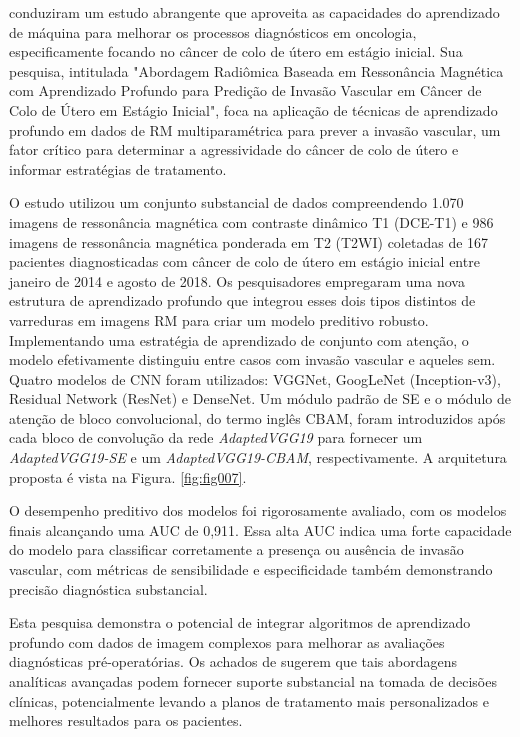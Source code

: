  \cite{jiangMRIBasedRadiomics2021} conduziram um estudo abrangente que aproveita as capacidades do aprendizado de máquina para melhorar os processos diagnósticos em oncologia, especificamente focando no câncer de colo de útero em estágio inicial. Sua pesquisa, intitulada "Abordagem Radiômica Baseada em Ressonância Magnética com Aprendizado Profundo para Predição de Invasão Vascular em Câncer de Colo de Útero em Estágio Inicial", foca na aplicação de técnicas de aprendizado profundo em dados de \gls{RM} multiparamétrica para prever a invasão vascular, um fator crítico para determinar a agressividade do câncer de colo de útero e informar estratégias de tratamento.

O estudo utilizou um conjunto substancial de dados compreendendo 1.070 imagens de ressonância magnética com contraste dinâmico T1 (DCE-T1) e 986 imagens de ressonância magnética ponderada em T2 (T2WI) coletadas de 167 pacientes diagnosticadas com câncer de colo de útero em estágio inicial entre janeiro de 2014 e agosto de 2018. Os pesquisadores empregaram uma nova estrutura de aprendizado profundo que integrou esses dois tipos distintos de varreduras em imagens RM para criar um modelo preditivo robusto. Implementando uma estratégia de aprendizado de conjunto com atenção, o modelo efetivamente distinguiu entre casos com invasão vascular e aqueles sem. Quatro modelos de CNN foram utilizados: VGGNet, GoogLeNet (Inception-v3), Residual Network (ResNet) e DenseNet. Um módulo padrão de \gls{SE}  e o módulo de atenção de bloco convolucional, do termo inglês \gls{CBAM},  foram introduzidos após cada bloco de convolução da rede \textit{AdaptedVGG19} para fornecer um \textit{AdaptedVGG19-SE} e um \textit{AdaptedVGG19-CBAM}, respectivamente. A arquitetura proposta é vista na Figura. \ref{fig:fig007}.

O desempenho preditivo dos modelos foi rigorosamente avaliado, com os modelos finais alcançando uma \gls{AUC} de 0,911. Essa alta \gls{AUC} indica uma forte capacidade do modelo para classificar corretamente a presença ou ausência de invasão vascular, com métricas de sensibilidade e especificidade também demonstrando precisão diagnóstica substancial.

Esta pesquisa demonstra o potencial de integrar algoritmos de aprendizado profundo com dados de imagem complexos para melhorar as avaliações diagnósticas pré-operatórias. Os achados de \citeauthor{jiangMRIBasedRadiomics2021} sugerem que tais abordagens analíticas avançadas podem fornecer suporte substancial na tomada de decisões clínicas, potencialmente levando a planos de tratamento mais personalizados e melhores resultados para os pacientes.

